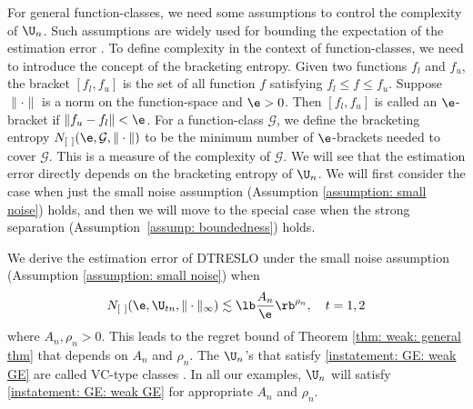 \documentclass[preprint] {imsart}
\begin{document}
For general function-classes, we  need some assumptions to control the complexity of $\U_n$. Such assumptions are widely used for bounding the expectation of the estimation error \citep{koltchinskii2009, bartlett2006, bartlett2002}.
To define complexity in the context of function-classes, we need to introduce the concept of the bracketing entropy. Given two functions $f_l$ and $f_u$, the bracket $[f_l,f_u]$ is the set of all function $f$ satisfying $f_l\leq f\leq f_u$. Suppose  $\|\cdot\|$ is a norm on the function-space  and $\e>0$. Then $[f_l,f_u]$ is called  an $\e$-bracket  if $\|f_u-f_l\|<\e$. For a function-class $\mathcal G$, we define the bracketing entropy $N_{[\ ]}(\e,\mathcal G,\|\cdot\|)$ to be the minimum number of $\e$-brackets needed to cover $\mathcal G$. This  is a measure of the complexity of $\mathcal G$.
We will see that the estimation error directly depends on the bracketing entropy  of $\U_n$. We will first consider the case when just the small noise assumption (Assumption \ref{assumption: small noise}) holds, and then we will move to the special case when the strong separation (Assumption~\ref{assump: boundedness}) holds. 

We derive the estimation error of DTRESLO under the small noise assumption  (Assumption \ref{assumption: small noise}) when
\begin{equation}\label{instatement: GE: weak GE}
    N_{[\ ]}(\e,\U_{tn}, \|\cdot\|_\infty)\lesssim \lb\frac{A_{n}}{\e}\rb^{\rho_n},\quad t=1,2
\end{equation}
where $A_n,\rho_n>0$.  This leads to the regret bound of Theorem \ref{thm: weak: general thm}  that depends on $A_n$ and $\rho_n$.
The $\U_n$'s that satisfy \eqref{instatement: GE: weak GE} are called VC-type classes \citep[p. 41][]{koltchinskii2009}. In all our examples, $\U_n$ will  satisfy \eqref{instatement: GE: weak GE} for appropriate $A_n$ and $\rho_n$.
\end{document}
